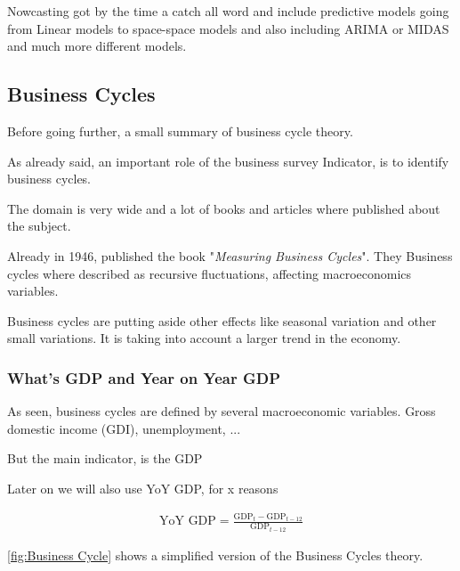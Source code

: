 \documentclass[12pt,a4paper,oneside]{book}
\begin{document}
Nowcasting got by the time a catch all word and include predictive models going from Linear models to space-space models and also including ARIMA or MIDAS and much more different models.



\subsection{Business Cycles}
\label{sec:Business Cycles}

Before going further, a small summary of business cycle theory. 

As already said, an important role of the business survey Indicator, is to identify business cycles.


The domain is very wide and a lot of books and articles where published about the subject. 

Already in 1946, \citeauthor{mitchell_measuring_1946} published the book "\textit{Measuring Business Cycles}". They 
Business cycles where described as recursive fluctuations, affecting macroeconomics variables.

Business cycles are putting aside other effects like seasonal variation and other small variations. It is taking into account a larger trend in the economy.

\subsubsection{What's GDP and Year on Year GDP}

As seen, business cycles are defined by several macroeconomic variables. 
Gross domestic income (GDI), unemployment, ...

But the main indicator, is the GDP

Later on we will also use YoY GDP, for x reasons

\begin{eqnarray}
   \mbox{YoY GDP} = \frac{\mbox{GDP}_t - \mbox{GDP}_{t-12}}{\mbox{GDP}_{t-12}} 
\end{eqnarray}

\autoref{fig:Business Cycle} shows a simplified version of the Business Cycles theory.
\end{document}
